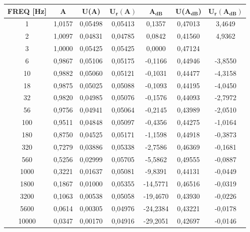 \begin{table}[!ht]
    \centering
    \begin{tabular}{|c|c|c|c|c|c|c|}
    \hline

        \textbf{FREQ [Hz]} & \textbf{A} & \textbf{U(A)} & $\bm{U_r(A)}$ & $\bm{A_{dB}}$ & \textbf{U($\bm{A_{dB}}$)} & $\bm{U_r(A_{dB})}$ \\ \hline

        1 & 1,0157 & 0,05498 & 0,05413 & 0,1357 & 0,47013 & 3,4649 \\ \hline
        2 & 1,0097 & 0,04831 & 0,04785 & 0,0842 & 0,41560 & 4,9362 \\ \hline
        3 & 1,0000 & 0,05425 & 0,05425 & 0,0000 & 0,47124 & ~ \\ \hline
        6 & 0,9867 & 0,05106 & 0,05175 & -0,1166 & 0,44946 & -3,8550 \\ \hline
        10 & 0,9882 & 0,05060 & 0,05121 & -0,1031 & 0,44477 & -4,3158 \\ \hline
        18 & 0,9875 & 0,05025 & 0,05088 & -0,1093 & 0,44195 & -4,0450 \\ \hline
        32 & 0,9820 & 0,04985 & 0,05076 & -0,1576 & 0,44093 & -2,7972 \\ \hline
        56 & 0,9756 & 0,04941 & 0,05064 & -0,2145 & 0,43989 & -2,0510 \\ \hline
        100 & 0,9511 & 0,04848 & 0,05097 & -0,4356 & 0,44275 & -1,0164 \\ \hline
        180 & 0,8750 & 0,04525 & 0,05171 & -1,1598 & 0,44918 & -0,3873 \\ \hline
        320 & 0,7279 & 0,03886 & 0,05338 & -2,7586 & 0,46369 & -0,1681 \\ \hline
        560 & 0,5256 & 0,02999 & 0,05705 & -5,5862 & 0,49555 & -0,0887 \\ \hline
        1000 & 0,3221 & 0,01637 & 0,05081 & -9,8391 & 0,44131 & -0,0449 \\ \hline
        1800 & 0,1867 & 0,01000 & 0,05355 & -14,5771 & 0,46516 & -0,0319 \\ \hline
        3200 & 0,1063 & 0,00538 & 0,05058 & -19,4670 & 0,43930 & -0,0226 \\ \hline
        5600 & 0,0614 & 0,00305 & 0,04976 & -24,2384 & 0,43221 & -0,0178 \\ \hline
        10000 & 0,0347 & 0,00170 & 0,04916 & -29,2051 & 0,42697 & -0,0146 \\ \hline
    \end{tabular}
\end{table}

